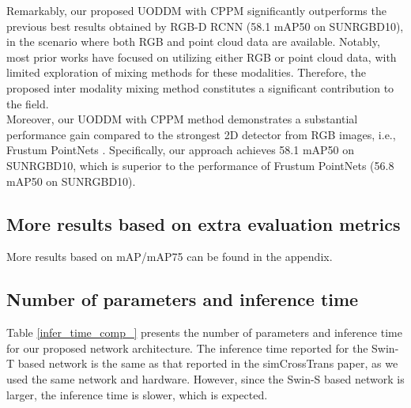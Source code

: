 \documentclass[]{modified_llncs}
\begin{document}
Remarkably, our proposed UODDM with CPPM significantly outperforms the previous best results obtained by RGB-D RCNN \cite{GuptaGAM14} (58.1 mAP50 on SUNRGBD10), in the scenario where both RGB and point cloud data are available. Notably, most prior works have focused on utilizing either RGB or point cloud data, with limited exploration of mixing methods for these modalities. Therefore, the proposed inter modality mixing method constitutes a significant contribution to the field.\\

Moreover, our UODDM with CPPM method demonstrates a substantial performance gain compared to the strongest 2D detector from RGB images, i.e., Frustum PointNets \cite{Qi_2018_CVPR}. Specifically, our approach achieves 58.1 mAP50 on SUNRGBD10, which is superior to the performance of Frustum PointNets (56.8 mAP50 on SUNRGBD10).
\subsection{More results based on extra evaluation metrics}
More results based on mAP/mAP75 can be found in the appendix.
\subsection{Number of parameters and inference time}
\begin{table}[H]
\scriptsize
\begin{center}
\end{center}
\caption {Number of parameters and inference time comparison. All speed testing are based on a standard single NVIDIA Titan-X GPU.}
\label{infer_time_comp_}
\end{table}
Table \ref{infer_time_comp_} presents the number of parameters and inference time for our proposed network architecture. The inference time reported for the Swin-T based network is the same as that reported in the simCrossTrans \cite{simCrossTrans_cite} paper, as we used the same network and hardware. However, since the Swin-S based network is larger, the inference time is slower, which is expected.
\end{document}
